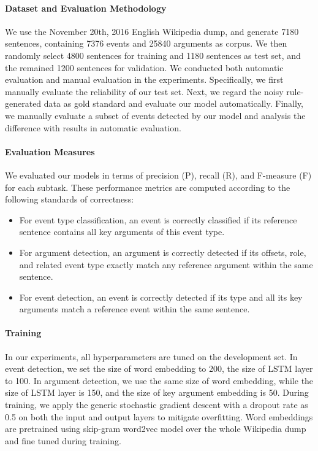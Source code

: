 \documentclass{article}
\begin{document}
\paragraph{Dataset and Evaluation Methodology}
We use the November 20th, 2016 English Wikipedia dump, and generate 7180 sentences, containing 7376 events and 25840 arguments as corpus. We then randomly select 4800 sentences for training and 1180 sentences as test set, and the remained 1200 sentences for validation. We conducted both automatic evaluation and manual evaluation in the experiments. Specifically, we first manually evaluate the reliability of our test set. Next, we regard the noisy rule-generated data as gold standard and evaluate our model automatically. Finally, we manually evaluate a subset of events detected by our model and analysis the difference with results in automatic evaluation.

\paragraph{Evaluation Measures}
We evaluated our models in terms of precision (P), recall (R), and F-measure (F) for each subtask. These performance metrics are computed according to the following standards of correctness:

\begin{itemize}
	\item For event type classification, an event is correctly classified if its reference sentence contains all key arguments of this event type.
	\item For argument detection, an argument is correctly detected if its offsets, role, and related event type exactly match any reference argument within the same sentence.
	\item For event detection, an event is correctly detected if its type and all its key arguments match a reference event within the same sentence.
\end{itemize}

\paragraph{Training}
In our experiments, all hyperparameters are tuned on the development set. In event detection, we set the size of word embedding to 200, the size of LSTM layer to 100. In argument detection, we use the same size of word embedding, while the size of LSTM layer is 150, and the size of key argument embedding is 50.
During training, we apply the generic stochastic gradient descent \cite{bottou2010large} with a dropout rate as 0.5 on both the input and output layers to mitigate overfitting. Word embeddings are pretrained using skip-gram word2vec model \cite{mikolov2013distributed} over the whole Wikipedia dump and fine tuned during training. 
\end{document}
